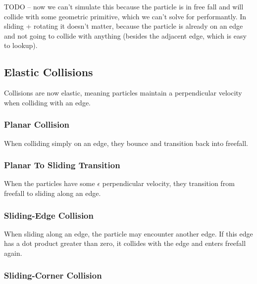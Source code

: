 


TODO -- now we can't simulate this because the particle is in free fall and will collide with some geometric primitive, which we can't solve for performantly. In sliding + rotating it doesn't matter, because the particle is already on an edge and not going to collide with anything (besides the adjacent edge, which is easy to lookup).

	\subsection{Elastic Collisions}

	Collisions are now elastic, meaning particles maintain a perpendicular velocity when colliding with an edge.

		\subsubsection{Planar Collision}

		When colliding simply on an edge, they bounce and transition back into freefall.


		\subsubsection{Planar To Sliding Transition}

		When the particles have some $\epsilon$ perpendicular velocity, they transition from freefall to sliding along an edge.


		\subsubsection{Sliding-Edge Collision}

		When sliding along an edge, the particle may encounter another edge. If this edge has a dot product greater than zero, it collides with the edge and enters freefall again.


		\subsubsection{Sliding-Corner Collision}

